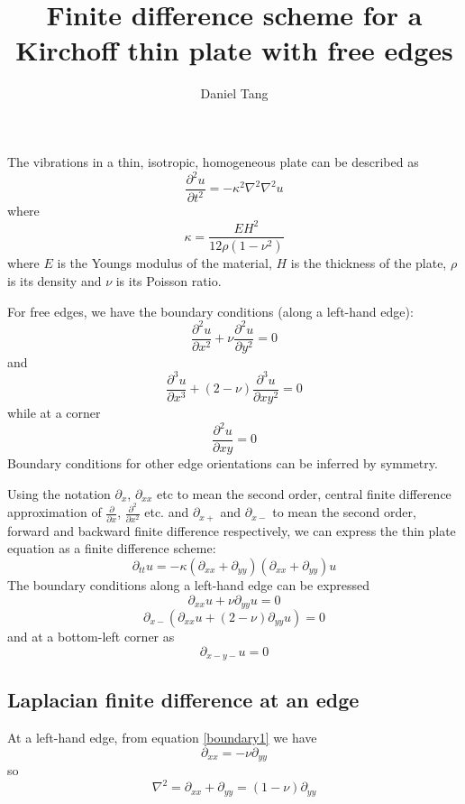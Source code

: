 \documentclass[a4paper]{article}
\title{Finite difference scheme for a Kirchoff thin plate with free edges}
\author{Daniel Tang}
\begin{document}
\maketitle
The vibrations in a thin, isotropic, homogeneous plate can be described as
\[
\frac{\partial^2 u}{\partial t^2} = -\kappa^2 \nabla^2 \nabla^2 u
\]
where
\[
\kappa = \frac{EH^2}{12\rho(1-\nu^2)}
\]
where $E$ is the Youngs modulus of the material, $H$ is the thickness of the plate, $\rho$ is its density and $\nu$ is its Poisson ratio.

For free edges, we have the boundary conditions (along a left-hand edge):
\[
\frac{\partial^2u}{\partial x^2} + \nu \frac{\partial^2u}{\partial y^2} = 0
\]
and
\[
\frac{\partial^3u}{\partial x^3} + (2-\nu) \frac{\partial^3u}{\partial xy^2} = 0
\]
while at a corner
\[
\frac{\partial^2u}{\partial xy} = 0
\]
Boundary conditions for other edge orientations can be inferred by symmetry.

Using the notation $\partial_x$, $\partial_{xx}$ etc to mean the second order, central finite difference approximation of $\frac{\partial}{\partial x}$, $\frac{\partial^2}{\partial x^2}$ etc. and $\partial_{x+}$ and $\partial_{x-}$ to mean the second order, forward and backward finite difference respectively, we can express the thin plate equation as a finite difference scheme:
\[
\partial_{tt} u = -\kappa (\partial_{xx} + \partial_{yy})(\partial_{xx} + \partial_{yy})u
\]
The boundary conditions along a left-hand edge can be expressed
\begin{equation}
\partial_{xx}u + \nu \partial_{yy}u = 0
\label{boundary1}
\end{equation}
\begin{equation}
\partial_{x-}(\partial_{xx}u + (2-\nu)\partial_{yy}u) = 0
\label{boundary2}
\end{equation}
and at a bottom-left corner as
\begin{equation}
\partial_{x-y-}u = 0
\label{boundarycorner}
\end{equation}

\subsection{Laplacian finite difference at an edge}
At a left-hand edge, from equation \ref{boundary1} we have
\[
\partial_{xx} = - \nu \partial_{yy} 
\]
so
\begin{equation}
\nabla^2 = \partial_{xx} + \partial_{yy} = (1-\nu)\partial_{yy}
\label{delta}
\end{equation}
\end{document}
